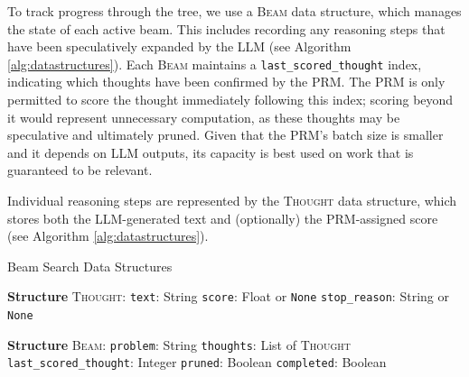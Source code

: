 \documentclass[12pt,twoside]{report}
\begin{document}
To track progress through the tree, we use a \textsc{Beam} data structure, which manages the state of each active beam. 
This includes recording any reasoning steps that have been speculatively expanded by the LLM (see Algorithm \ref{alg:datastructures}). 
Each \textsc{Beam} maintains a \texttt{last\_scored\_thought} index, indicating which thoughts have been confirmed by the PRM. 
The PRM is only permitted to score the thought immediately following this index; scoring beyond it would represent unnecessary computation, as these thoughts may be speculative and ultimately pruned. 
Given that the PRM’s batch size is smaller and it depends on LLM outputs, its capacity is best used on work that is guaranteed to be relevant.

Individual reasoning steps are represented by the \textsc{Thought} data structure, which stores both the LLM-generated text and (optionally) the PRM-assigned score (see Algorithm \ref{alg:datastructures}).

\begin{algorithm}[H]\label{alg:datastructures}
\caption{Beam Search Data Structures}
\begin{algorithmic}[1]
\State \textbf{Structure} \textsc{Thought}:
\State \hspace{0.5cm} \texttt{text}: String 
\State \hspace{0.5cm} \texttt{score}: Float or \texttt{None} 
\State \hspace{0.5cm} \texttt{stop\_reason}: String or \texttt{None} 

\Statex

\State \textbf{Structure} \textsc{Beam}:
\State \hspace{0.5cm} \texttt{problem}: String 
\State \hspace{0.5cm} \texttt{thoughts}: List of \textsc{Thought} 
\State \hspace{0.5cm} \texttt{last\_scored\_thought}: Integer 
\State \hspace{0.5cm} \texttt{pruned}: Boolean 
\State \hspace{0.5cm} \texttt{completed}: Boolean 
\end{algorithmic}
\end{algorithm}
\end{document}
